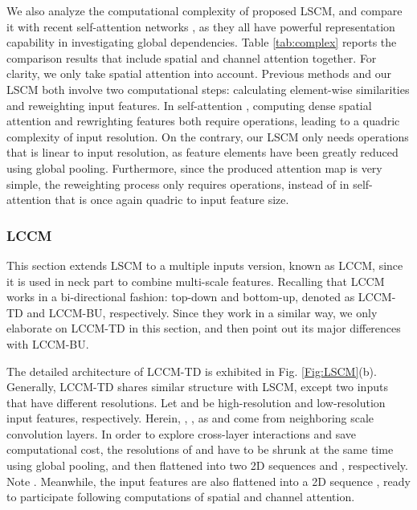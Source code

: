 \documentclass[lettersize,journal]{IEEEtran}
\begin{document}
We also analyze the computational complexity of proposed LSCM, and compare it with recent self-attention networks \cite{wang2018non,fu2019dual}, as they all have powerful representation capability in investigating global dependencies. Table \ref{tab:complex} reports the comparison results that include spatial and channel attention together. For clarity, we only take spatial attention into account.
Previous methods \cite{wang2018non,fu2019dual} and our LSCM both involve two computational steps: calculating element-wise similarities and reweighting input features. In self-attention \cite{wang2018non}, computing dense spatial attention and rewrighting features both require  operations, leading to a quadric complexity of input resolution. On the contrary, our LSCM only needs  operations that is linear to input resolution, as feature elements have been greatly reduced using global pooling. Furthermore, since the produced attention map is very simple, the reweighting process only requires  operations, instead of  in self-attention that is once again quadric to input feature size. 



\subsubsection{LCCM}

This section extends LSCM to a multiple inputs version, known as LCCM, since it is used in neck part to combine multi-scale features. Recalling that LCCM works in a bi-directional fashion: top-down and bottom-up, denoted as LCCM-TD and LCCM-BU, respectively. Since they work in a similar way, we only elaborate on LCCM-TD in this section, and then point out its major differences with LCCM-BU.

The detailed architecture of LCCM-TD is exhibited in Fig. \ref{Fig:LSCM}(b). Generally, LCCM-TD shares similar structure with LSCM, except two inputs that have different resolutions. Let  and  be high-resolution and low-resolution input features, respectively. Herein, , , as  and  come from neighboring scale convolution layers. In order to explore cross-layer interactions and save computational cost, the resolutions of  and  have to be shrunk at the same time using global pooling, and then flattened into two 2D sequences  and , respectively. Note . Meanwhile, the input features  are also flattened into a 2D sequence , ready to participate following computations of spatial and channel attention.
\end{document}
